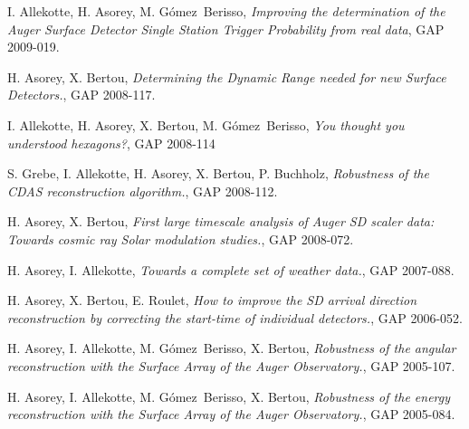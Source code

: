 \begin{etaremune}
\item {}I. Allekotte, H. Asorey, M. Gómez~Berisso, {\emph{Improving the determination of the Auger Surface Detector Single Station Trigger Probability from real data}}, GAP 2009-019.

\item {}H. Asorey, X. Bertou, {\emph{Determining the Dynamic Range needed for new Surface Detectors.}}, GAP 2008-117.

\item {}I. Allekotte, H. Asorey, X. Bertou, M. Gómez~Berisso, {\emph{You thought you understood hexagons?}}, GAP 2008-114

\item {}S. Grebe, I. Allekotte, H. Asorey, X. Bertou, P. Buchholz, {\emph{Robustness of the CDAS reconstruction algorithm.}}, GAP 2008-112.

\item {}H. Asorey, X. Bertou, {\emph{First large timescale analysis of Auger SD scaler data: Towards cosmic ray Solar modulation studies.}}, GAP 2008-072.

\item {}H. Asorey, I. Allekotte, {\emph{Towards a complete set of weather data.}}, GAP 2007-088.

\item {}H. Asorey, X. Bertou, E. Roulet, {\emph{How to improve the SD arrival direction reconstruction by correcting the start-time of individual detectors.}}, GAP 2006-052.

\item {}H. Asorey, I. Allekotte, M. Gómez~Berisso, X. Bertou, {\emph{Robustness of the angular reconstruction with the Surface Array of the Auger Observatory.}}, GAP 2005-107.

\item {}H. Asorey, I. Allekotte, M. Gómez~Berisso, X. Bertou, {\emph{Robustness of the energy reconstruction with the Surface Array of the Auger Observatory.}}, GAP 2005-084.
\end{etaremune}
